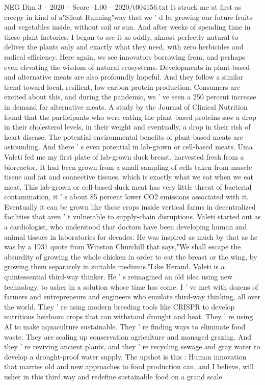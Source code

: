 \begin{textsample}{NEG Dim 3 – 2020 – Score -1.00 – 2020/t004156.txt}
It struck me at first as creepy in kind of a"Silent Running"way that we ' d be growing our future fruits and vegetables inside, without soil or sun.
And after weeks of spending time in these plant factories, I began to see it as oddly, almost perfectly natural to deliver the plants only and exactly what they need, with zero herbicides and radical efficiency.
Here again, we see innovators borrowing from, and perhaps even elevating the wisdom of natural ecosystems.
Developments in plant-based and alternative meats are also profoundly hopeful.
And they follow a similar trend toward local, resilient, low-carbon protein production.
Consumers are excited about this, and during the pandemic, we ' ve seen a 250 percent increase in demand for alternative meats.
A study by the Journal of Clinical Nutrition found that the participants who were eating the plant-based proteins saw a drop in their cholesterol levels, in their weight and eventually, a drop in their risk of heart disease.
The potential environmental benefits of plant-based meats are astounding.
And there ' s even potential in lab-grown or cell-based meats.
Uma Valeti fed me my first plate of lab-grown duck breast, harvested fresh from a bioreactor.
It had been grown from a small sampling of cells taken from muscle tissue and fat and connective tissues, which is exactly what we eat when we eat meat.
This lab-grown or cell-based duck meat has very little threat of bacterial contamination, it ' s about 85 percent lower CO2 emissions associated with it.
Eventually it can be grown like those crops inside vertical farms in decentralized facilities that aren ' t vulnerable to supply-chain disruptions.
Valeti started out as a cardiologist, who understood that doctors have been developing human and animal tissues in laboratories for decades.
He was inspired as much by that as he was by a 1931 quote from Winston Churchill that says,"We shall escape the absurdity of growing the whole chicken in order to eat the breast or the wing, by growing them separately in suitable mediums."Like Heraud, Valeti is a quintessential third-way thinker.
He ' s reimagined an old idea using new technology, to usher in a solution whose time has come.
I ' ve met with dozens of farmers and entrepreneurs and engineers who emulate third-way thinking, all over the world.
They ' re using modern breeding tools like CRISPR to develop nutritious heirloom crops that can withstand drought and heat.
They ' re using AI to make aquaculture sustainable.
They ' re finding ways to eliminate food waste.
They are scaling up conservation agriculture and managed grazing.
And they ' re reviving ancient plants, and they ' re recycling sewage and gray water to develop a drought-proof water supply.
The upshot is this : Human innovation that marries old and new approaches to food production can, and I believe, will usher in this third way and redefine sustainable food on a grand scale.

\end{textsample}
